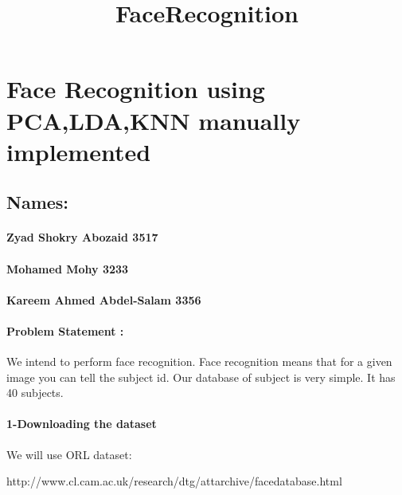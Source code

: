 \documentclass[11pt]{article}
\title{FaceRecognition}
\begin{document}
    
    
    \maketitle
    
    

    
    \section{Face Recognition using PCA,LDA,KNN manually
implemented}\label{face-recognition-using-pcaldaknn-manually-implemented}

    \subsection{Names:}\label{names}

\paragraph{Zyad Shokry Abozaid 3517}\label{zyad-shokry-abozaid-3517}

\paragraph{Mohamed Mohy 3233}\label{mohamed-mohy-3233}

\paragraph{Kareem Ahmed Abdel-Salam
3356}\label{kareem-ahmed-abdel-salam-3356}

    \paragraph{Problem Statement :}\label{problem-statement}

We intend to perform face recognition. Face recognition means that for a
given image you can tell the subject id. Our database of subject is very
simple. It has 40 subjects.

    \paragraph{1-Downloading the dataset}\label{downloading-the-dataset}

We will use ORL dataset:

http://www.cl.cam.ac.uk/research/dtg/attarchive/facedatabase.html
\end{document}
